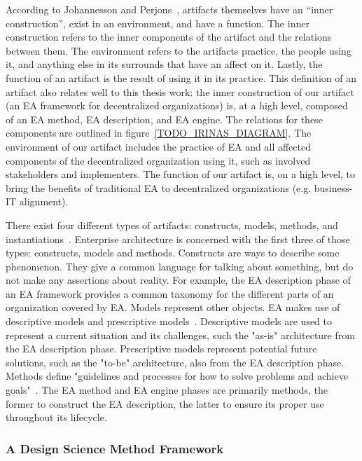 According to Johannesson and Perjons~\cite{johannessonPerjons2012}, artifacts themselves have an ``inner construction'', exist in an environment, and have a function. The inner construction refers to the inner components of the artifact and the relations between them. The environment refers to the artifacts practice, the people using it, and anything else in its surrounds that have an affect on it. Lastly, the function of an artifact is the result of using it in its practice. This definition of an artifact also relates well to this thesis work: the inner construction of our artifact (an EA framework for decentralized organizations) is, at a high level, composed of an EA method, EA description, and EA engine. The relations for these components are outlined in figure~\ref{TODO_IRINAS_DIAGRAM}. The environment of our artifact includes the practice of EA and all affected components of the decentralized organization using it, such as involved stakeholders and implementers. The function of our artifact is, on a high level, to bring the benefits of traditional EA to decentralized organizations (e.g. business-IT alignment).


There exist four different types of artifacts: constructs, models, methods, and instantiations~\cite{hevner2004,johannessonPerjons2012}. Enterprise architecture is concerned with the first three of those types: constructs, models and methods. Constructs are ways to describe some phenomenon. They give a common language for talking about something, but do not make any assertions about reality. For example, the EA description phase of an EA framework provides a common taxonomy for the different parts of an organization covered by EA. Models represent other objects. EA makes use of descriptive models and prescriptive models~\cite{johannessonPerjons2012}. Descriptive models are used to represent a current situation and its challenges, such the "as-is" architecture from the EA description phase. Prescriptive models represent potential future solutions, such as the "to-be" architecture, also from the EA description phase. Methods define "guidelines and processes for how to solve problems and achieve goals"~\cite{johannessonPerjons2012}. The EA method and EA engine phases are primarily methods, the former to construct the EA description, the latter to ensure its proper use throughout its lifecycle. 

\subsubsection{A Design Science Method Framework}

